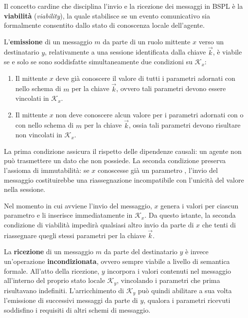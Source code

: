 Il concetto cardine che disciplina l'invio e la ricezione dei messaggi in BSPL è la 
\textbf{viabilità} (\emph{viability}), la quale stabilisce se un evento comunicativo sia 
formalmente consentito dallo stato di conoscenza locale dell'agente.

L'\textbf{emissione} di un messaggio $m$ da parte di un ruolo mittente $x$ verso un destinatario $y$, 
relativamente a una sessione identificata dalla chiave $\vec{k}$, è viabile se e solo se sono 
soddisfatte simultaneamente due condizioni su $\mathcal{K}_x$:
\begin{enumerate}
    \item Il mittente $x$ deve già conoscere il valore 
    di tutti i parametri adornati con  nello schema di $m$ per la 
    chiave $\vec{k}$, ovvero tali parametri devono essere vincolati in $\mathcal{K}_x$.
    \item Il mittente $x$ non deve conoscere alcun valore 
    per i parametri adornati con  o con  
    nello schema di $m$ per la chiave $\vec{k}$, ossia tali parametri devono risultare non vincolati in $\mathcal{K}_x$.
\end{enumerate}

La prima condizione assicura il rispetto delle dipendenze causali: un agente non può trasmettere un dato che non possiede. 
La seconda condizione preserva l'assioma di immutabilità: se $x$ conoscesse già un parametro , 
l'invio del messaggio costituirebbe una riassegnazione incompatibile con l'unicità del valore nella sessione.

Nel momento in cui avviene l'invio del messaggio, $x$ genera i valori per ciascun parametro  
e li inserisce immediatamente in $\mathcal{K}_x$. Da questo istante, la seconda condizione di viabilità 
impedirà qualsiasi altro invio da parte di $x$ che tenti di riassegnare quegli stessi 
parametri per la chiave $\vec{k}$.

La \textbf{ricezione} di un messaggio $m$ da parte del destinatario $y$ è invece un'operazione \textbf{incondizionata},
ovvero sempre viabile a livello di semantica formale.
All'atto della ricezione, $y$ incorpora i valori contenuti nel messaggio all'interno del proprio stato locale 
$\mathcal{K}_y$, vincolando i parametri che prima risultavano indefiniti. L'arricchimento di $\mathcal{K}_y$ può 
quindi abilitare a sua volta l'emissione di successivi messaggi da parte di $y$, qualora i parametri ricevuti soddisfino 
i requisiti  di altri schemi di messaggio.

